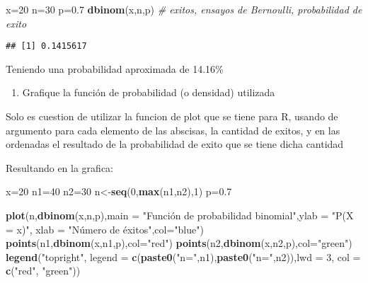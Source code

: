 \documentclass[
]{article}
\newenvironment{Shaded}{\begin{snugshade}}{\end{snugshade}}
\newcommand{\AttributeTok}[1]{\textcolor[rgb]{0.13,0.29,0.53}{#1}}
\newcommand{\CommentTok}[1]{\textcolor[rgb]{0.56,0.35,0.01}{\textit{#1}}}
\newcommand{\DecValTok}[1]{\textcolor[rgb]{0.00,0.00,0.81}{#1}}
\newcommand{\FloatTok}[1]{\textcolor[rgb]{0.00,0.00,0.81}{#1}}
\newcommand{\FunctionTok}[1]{\textcolor[rgb]{0.13,0.29,0.53}{\textbf{#1}}}
\newcommand{\NormalTok}[1]{#1}
\newcommand{\OtherTok}[1]{\textcolor[rgb]{0.56,0.35,0.01}{#1}}
\newcommand{\StringTok}[1]{\textcolor[rgb]{0.31,0.60,0.02}{#1}}
\providecommand{\tightlist}{%
  \setlength{\itemsep}{0pt}\setlength{\parskip}{0pt}}
\begin{document}
\begin{Shaded}
\begin{Highlighting}[]
\NormalTok{x}\OtherTok{=}\DecValTok{20}
\NormalTok{n}\OtherTok{=}\DecValTok{30}
\NormalTok{p}\OtherTok{=}\FloatTok{0.7}
\FunctionTok{dbinom}\NormalTok{(x,n,p) }\CommentTok{\# exitos, ensayos de Bernoulli, probabilidad de exito}
\end{Highlighting}
\end{Shaded}

\begin{verbatim}
## [1] 0.1415617
\end{verbatim}

Teniendo una probabilidad aproximada de 14.16\%

\begin{enumerate}
\def\labelenumi{\arabic{enumi}.}
\setcounter{enumi}{2}
\tightlist
\item
  Grafique la función de probabilidad (o densidad) utilizada
\end{enumerate}

Solo es cuestion de utilizar la funcion de plot que se tiene para R,
usando de argumento para cada elemento de las abscisas, la cantidad de
exitos, y en las ordenadas el resultado de la probabilidad de exito que
se tiene dicha cantidad

Resultando en la grafica:

\begin{Shaded}
\begin{Highlighting}[]
\NormalTok{x}\OtherTok{=}\DecValTok{20}
\NormalTok{n1}\OtherTok{=}\DecValTok{40}
\NormalTok{n2}\OtherTok{=}\DecValTok{30}
\NormalTok{n}\OtherTok{\textless{}{-}}\FunctionTok{seq}\NormalTok{(}\DecValTok{0}\NormalTok{,}\FunctionTok{max}\NormalTok{(n1,n2),}\DecValTok{1}\NormalTok{)}
\NormalTok{p}\OtherTok{=}\FloatTok{0.7}

\FunctionTok{plot}\NormalTok{(n,}\FunctionTok{dbinom}\NormalTok{(x,n,p),}\AttributeTok{main =} \StringTok{"Función de probabilidad binomial"}\NormalTok{,}\AttributeTok{ylab =} \StringTok{"P(X = x)"}\NormalTok{, }\AttributeTok{xlab =} \StringTok{"Número de éxitos"}\NormalTok{,}\AttributeTok{col=}\StringTok{"blue"}\NormalTok{) }
\FunctionTok{points}\NormalTok{(n1,}\FunctionTok{dbinom}\NormalTok{(x,n1,p),}\AttributeTok{col=}\StringTok{"red"}\NormalTok{)}
\FunctionTok{points}\NormalTok{(n2,}\FunctionTok{dbinom}\NormalTok{(x,n2,p),}\AttributeTok{col=}\StringTok{"green"}\NormalTok{)}
\FunctionTok{legend}\NormalTok{(}\StringTok{"topright"}\NormalTok{, }\AttributeTok{legend =} \FunctionTok{c}\NormalTok{(}\FunctionTok{paste0}\NormalTok{(}\StringTok{"n="}\NormalTok{,n1),}\FunctionTok{paste0}\NormalTok{(}\StringTok{"n="}\NormalTok{,n2)),}\AttributeTok{lwd =} \DecValTok{3}\NormalTok{, }\AttributeTok{col =} \FunctionTok{c}\NormalTok{(}\StringTok{"red"}\NormalTok{, }\StringTok{"green"}\NormalTok{))}
\end{Highlighting}
\end{Shaded}
\end{document}

